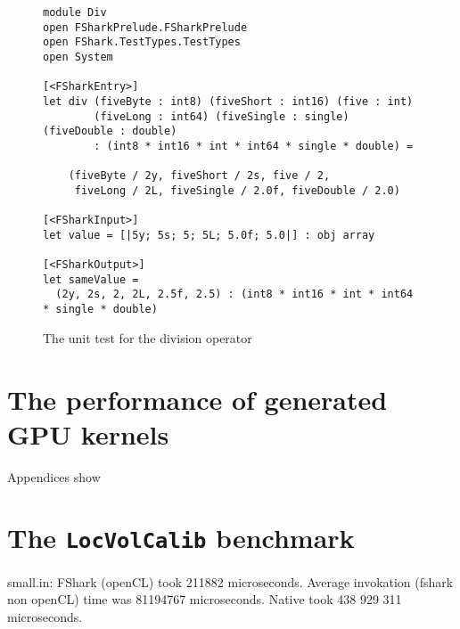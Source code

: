 \begin{figure}[h]
  \centering
\begin{verbatim}
module Div
open FSharkPrelude.FSharkPrelude
open FShark.TestTypes.TestTypes
open System

[<FSharkEntry>]
let div (fiveByte : int8) (fiveShort : int16) (five : int) 
        (fiveLong : int64) (fiveSingle : single) (fiveDouble : double) 
        : (int8 * int16 * int * int64 * single * double) =

    (fiveByte / 2y, fiveShort / 2s, five / 2, 
     fiveLong / 2L, fiveSingle / 2.0f, fiveDouble / 2.0)

[<FSharkInput>]
let value = [|5y; 5s; 5; 5L; 5.0f; 5.0|] : obj array

[<FSharkOutput>]
let sameValue = 
  (2y, 2s, 2, 2L, 2.5f, 2.5) : (int8 * int16 * int * int64 * single * double)
\end{verbatim}
  \caption{The unit test for the \fshark{} division operator}
  \label{fig:fsharkdivtest}
\end{figure}


\section{The performance of \fshark{} generated GPU kernels}

Appendices show 
\section*{The \texttt{LocVolCalib} benchmark}
small.in:
FShark (openCL) took 211882 microseconds.
Average invokation (fshark non openCL) time was 81194767 microseconds.
Native took 438 929 311 microseconds.


